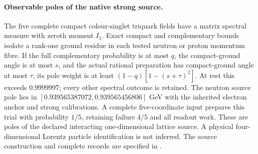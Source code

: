 \paragraph{Observable poles of the native strong source.}
The five complete compact colour-singlet triquark fields have a matrix
spectral measure with zeroth moment $I_5$. Exact compact and complementary
bounds isolate a rank-one ground residue in each tested neutron or proton
momentum fibre. If the full complementary probability is at most $q$, the
compact-ground angle is at most $s$, and the actual rational preparation
has compact-ground angle at most $\tau$, its pole weight is at least
$(1-q)[1-(s+\tau)^2]$. At rest this exceeds $0.9999997$; every other
spectral outcome is retained. The neutron source pole lies in
$[0.939565387072,0.939565456806]$ GeV with the inherited electron anchor
and strong calibrations. A complete five-coordinate input prepares this
trial with probability $1/5$, retaining failure $4/5$ and all readout work.
These are poles of the declared interacting one-dimensional lattice
source. A physical four-dimensional Lorentz particle identification is
not inferred. The source construction and complete records are specified
in .
